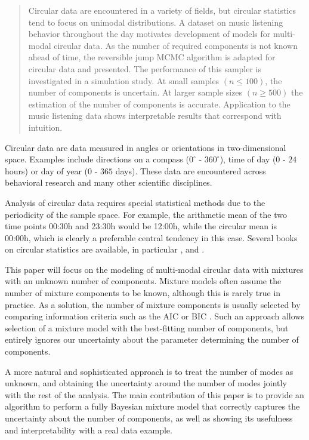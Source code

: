 \begin{abstract}

Circular data are encountered in a variety of fields, but circular statistics tend to focus on unimodal distributions. A dataset on music listening behavior throughout the day motivates development of models for multi-modal circular data. As the number of required components is not known ahead of time, the reversible jump MCMC algorithm is adapted for circular data and presented. The performance of this sampler is investigated in a simulation study. At small samples $(n \leq 100)$, the number of components is uncertain. At larger sample sizes $(n \geq 500)$ the estimation of the number of components is accurate. Application to the music listening data shows interpretable results that correspond with intuition.

\end{abstract}
\newpage
\label{introduction}
Circular data are data measured in angles or orientations in two-dimensional space. Examples include directions on a compass ($0^\circ$ - $360^\circ$), time of day ($0$ - $24$ hours) or day of year ($0$ - $365$ days). These data are encountered across behavioral research \citep{Mechsner:2001ff, Gurtman:2009jz} and many other scientific disciplines.

Analysis of circular data requires special statistical methods due to the periodicity of the sample space. For example, the arithmetic mean of the two time points 00:30h and 23:30h would be 12:00h, while the circular mean is 00:00h, which is clearly a preferable central tendency in this case. Several books on circular statistics are available, in particular \citet{pewsey2013circular}, \citet{Mardia2009} and \citet{fisher1995statistical}. 

This paper will focus on the modeling of multi-modal circular data with mixtures with an unknown number of components.  Mixture models often assume the number of mixture components to be known, although this is rarely true in practice. As a solution, the number of mixture components is usually selected by comparing information criteria such as the AIC \citep{Akaike:1974ta} or BIC \citep{Schwarz:1978kf}. Such an approach allows selection of a mixture model with the best-fitting number of components, but entirely ignores our uncertainty about the parameter determining the number of components. 

A more natural and sophisticated approach is to treat the number of modes as unknown, and obtaining the uncertainty around the number of modes jointly with the rest of the analysis. The main contribution of this paper is to provide an algorithm to perform a fully Bayesian mixture model that correctly captures the uncertainty about the number of components, as well as showing its usefulness and interpretability with a real data example.

